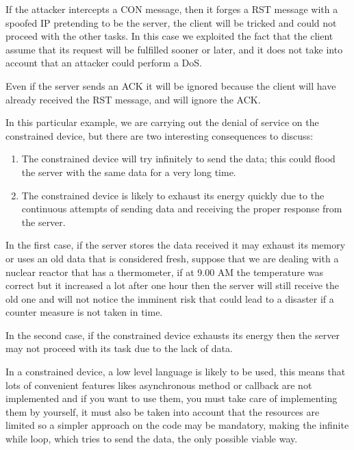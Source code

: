 	If the attacker intercepts a CON message, then it forges a RST message with a spoofed IP pretending to be the server, the client will be tricked and could not proceed with the other tasks.\newline
	In this case we exploited the fact that the client assume that its request will be fulfilled sooner or later, and it does not take into account that an attacker could perform a DoS.\newline
	
	Even if the server sends an ACK it will be ignored because the client will have already received the RST message, and will ignore the ACK.\newline
	
	In this particular example, we are carrying out the denial of service on the constrained device, but there are two interesting consequences to discuss:
	\begin{enumerate}
		\item The constrained device will try infinitely to send the data; this could flood the server with the same data for a very long time.
		\item The constrained device is likely to exhaust its energy quickly due to the continuous attempts of sending data and receiving the proper response from the server.
	\end{enumerate}

	In the first case, if the server stores the data received it may exhaust its memory or uses an old data that is considered fresh, suppose that we are dealing with a nuclear reactor that has a thermometer, if at 9.00 AM the temperature was correct but it increased a lot after one hour then the server will still receive the old one and will not notice the imminent risk that could lead to a disaster if a counter measure is not taken in time.\newline
	
	In the second case, if the constrained device exhausts its energy then the server may not proceed with its task due to the lack of data.\newline
	
	In a constrained device, a low level language is likely to be used, this means that lots of convenient features likes asynchronous method or callback are not implemented and if you want to use them, you must take care of implementing them by yourself, it must also be taken into account that the resources are limited so a simpler approach on the code may be mandatory, making the infinite while loop, which tries to send the data, the only possible viable way.\newline
	
